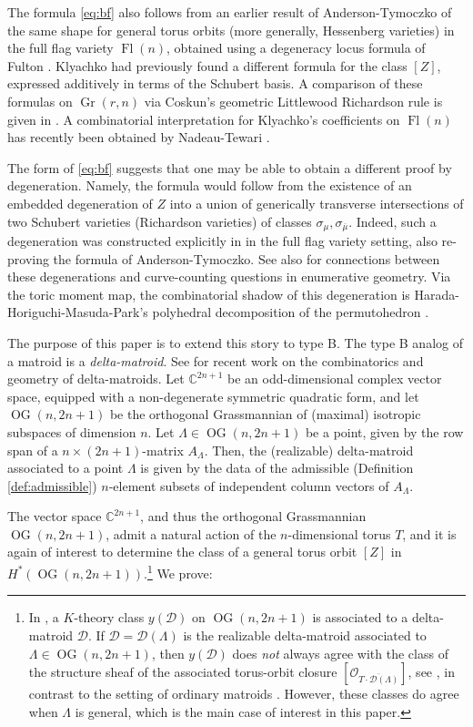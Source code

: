\documentclass[12pt]{amsart}
\DeclareMathOperator{\Fl}{Fl}
\DeclareMathOperator{\Gr}{Gr}
\DeclareMathOperator{\OG}{OG}
\newcommand{\bC}{\mathbb{C}}
\newcommand{\cD}{\mathcal{D}}
\newcommand{\cO}{\mathcal{O}}
\begin{document}
The formula \eqref{eq:bf} also follows from an earlier result of Anderson-Tymoczko \cite{at} of the same shape for general torus orbits (more generally, Hessenberg varieties) in the full flag variety $\Fl(n)$, obtained using a degeneracy locus formula of Fulton \cite{fulton}. Klyachko \cite{klyachko} had previously found a different formula for the class $[Z]$, expressed additively in terms of the Schubert basis. A comparison of these formulas on $\Gr(r,n)$ via Coskun's geometric Littlewood Richardson rule \cite{coskun_lr} is given in \cite{lian_lr}. A combinatorial interpretation for Klyachko's coefficients on $\Fl(n)$ has recently been obtained by Nadeau-Tewari \cite{nt}.

The form of \eqref{eq:bf} suggests that one may be able to obtain a different proof by degeneration. Namely, the formula would follow from the existence of an embedded degeneration of $Z$ into a union of generically transverse intersections of two Schubert varieties (Richardson varieties) of classes $\sigma_\mu,\sigma_{\overline{\mu}}$. Indeed, such a degeneration was constructed explicitly in \cite{lian_hhmp} in the full flag variety setting, also re-proving the formula of Anderson-Tymoczko. See also \cite{lian_pr} for connections between these degenerations and curve-counting questions in enumerative geometry. Via the toric moment map, the combinatorial shadow of this degeneration is Harada-Horiguchi-Masuda-Park's polyhedral decomposition of the permutohedron \cite{hhmp}.

The purpose of this paper is to extend this story to type B. The type B analog of a matroid is a \emph{delta-matroid}. See \cite{efls,els,larson} for recent work on the combinatorics and geometry of delta-matroids. Let $\bC^{2n+1}$ be an odd-dimensional complex vector space, equipped with a non-degenerate symmetric quadratic form, and let $\OG(n,2n+1)$ be the orthogonal Grassmannian of (maximal) isotropic subspaces of dimension $n$. Let $\Lambda\in \OG(n,2n+1)$ be a point, given by the row span of a $n\times (2n+1)$-matrix $A_\Lambda$. Then, the (realizable) delta-matroid associated to a point $\Lambda$ is given by the data of the admissible (Definition \ref{def:admissible}) $n$-element subsets of independent column vectors of $A_\Lambda$.

The vector space $\bC^{2n+1}$, and thus the orthogonal Grassmannian $\OG(n,2n+1)$, admit a natural action of the $n$-dimensional torus $T$, and it is again of interest to determine the class of a general torus orbit $[Z]$ in $H^{*}(\OG(n,2n+1))$.\footnote{In \cite{els}, a $K$-theory class $y(\cD)$ on $\OG(n,2n+1)$ is associated to a delta-matroid $\cD$. If $\cD=\cD(\Lambda)$ is the realizable delta-matroid associated to $\Lambda\in\OG(n,2n+1)$, then $y(\cD)$ does \emph{not} always agree with the class of the structure sheaf of the associated torus-orbit closure $[\cO_{\overline{T\cdot\cD(\Lambda)}}]$, see \cite[Proposition 2.3]{els}, in contrast to the setting of ordinary matroids \cite{speyer}. However, these classes do agree when $\Lambda$ is general, which is the main case of interest in this paper.} We prove:
\end{document}
